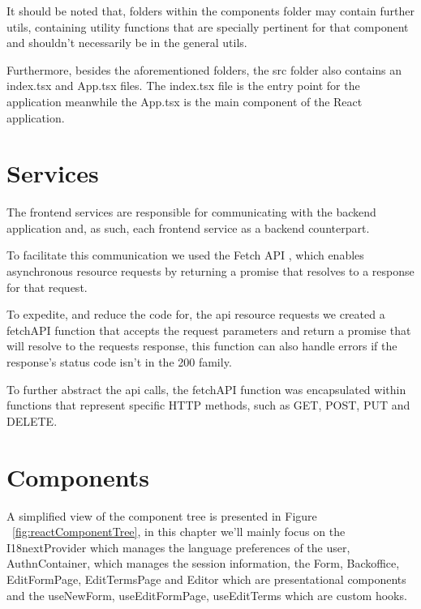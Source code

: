 It should be noted that, folders within the components folder may contain further utils, containing utility functions that are specially pertinent for that component and shouldn't necessarily be in the general utils. 

Furthermore, besides the aforementioned folders, the src folder also contains an index.tsx and App.tsx files. The index.tsx file is the entry point for the application meanwhile the App.tsx is the main component of the React application.


\section{Services}

The frontend services are responsible for communicating with the backend application and, as such, each frontend service as a backend counterpart.

To facilitate this communication we used the Fetch API \cite{Fetch_API}, which enables asynchronous resource requests by returning a promise that resolves to a response for that request.

To expedite, and reduce the code for, the api resource requests we created a fetchAPI function that accepts the request parameters and return a promise that will resolve to the requests response, this function can also handle errors if the response's status code isn't in the 200 family.

To further abstract the api calls,  the fetchAPI function was encapsulated within functions that represent specific HTTP methods, such as GET, POST, PUT and DELETE.

\newpage

\section{Components}

A simplified view of the component tree is presented in Figure ~\ref{fig:reactComponentTree}, in this chapter we'll mainly focus on the I18nextProvider which manages the language preferences of the user, AuthnContainer, which manages the session information, the Form, Backoffice, EditFormPage, EditTermsPage and Editor which are presentational components and the useNewForm, useEditFormPage, useEditTerms which are custom hooks.

